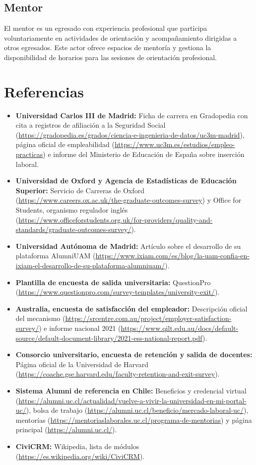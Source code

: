 \documentclass{./plantilla/umss}
\begin{document}
\subsection{Mentor}
El mentor es un egresado con experiencia profesional que participa voluntariamente en actividades de orientación y acompañamiento dirigidas a otros egresados. Este actor ofrece espacios de mentoría y gestiona la disponibilidad de horarios para las sesiones de orientación profesional.

\section{Referencias}

\begin{itemize}
    \item \textbf{Universidad Carlos III de Madrid:} Ficha de carrera en Gradopedia con cita a registros de afiliación a la Seguridad Social (\url{https://gradopedia.es/grados/ciencia-e-ingenieria-de-datos/uc3m-madrid}), página oficial de empleabilidad (\url{https://www.uc3m.es/estudios/empleo-practicas}) e informe del Ministerio de Educación de España sobre inserción laboral.
    \item \textbf{Universidad de Oxford y Agencia de Estadísticas de Educación Superior:} Servicio de Carreras de Oxford (\url{https://www.careers.ox.ac.uk/the-graduate-outcomes-survey}) y Office for Students, organismo regulador inglés (\url{https://www.officeforstudents.org.uk/for-providers/quality-and-standards/graduate-outcomes-survey/}).
    \item \textbf{Universidad Autónoma de Madrid:} Artículo sobre el desarrollo de su plataforma AlumniUAM (\url{https://www.ixiam.com/es/blog/la-uam-confia-en-ixiam-el-desarrollo-de-su-plataforma-alumniuam/}).
    \item \textbf{Plantilla de encuesta de salida universitaria:} QuestionPro (\url{https://www.questionpro.com/survey-templates/university-exit/}).
    \item \textbf{Australia, encuesta de satisfacción del empleador:} Descripción oficial del mecanismo (\url{https://srcentre.com.au/project/employer-satisfaction-survey/}) e informe nacional 2021 (\url{https://www.qilt.edu.au/docs/default-source/default-document-library/2021-ess-national-report.pdf}).
    \item \textbf{Consorcio universitario, encuesta de retención y salida de docentes:} Página oficial de la Universidad de Harvard (\url{https://coache.gse.harvard.edu/faculty-retention-and-exit-survey}).
    \item \textbf{Sistema Alumni de referencia en Chile:} Beneficios y credencial virtual (\url{https://alumni.uc.cl/actualidad/vuelve-a-vivir-la-universidad-en-mi-portal-uc/}), bolsa de trabajo (\url{https://alumni.uc.cl/beneficio/mercado-laboral-uc/}), mentorías (\url{https://mentoriaslaborales.uc.cl/programa-de-mentorias}) y página principal (\url{https://alumni.uc.cl/}).
    \item \textbf{CiviCRM:} Wikipedia, lista de módulos (\url{https://es.wikipedia.org/wiki/CiviCRM}).
\end{itemize}
\end{document}
